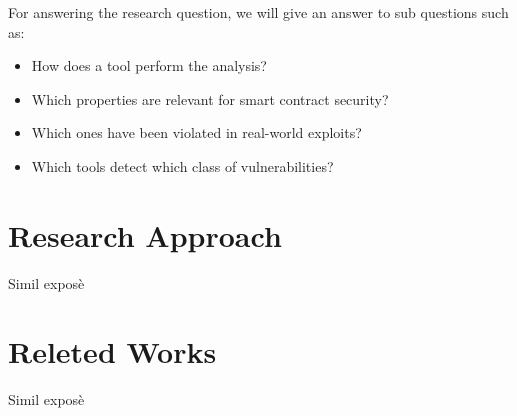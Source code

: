 For answering the research question, we will give an answer to sub questions such as: 
\begin{itemize}
  \item How does a tool perform the analysis? 
  \item Which properties are relevant for smart contract security?
  \item Which ones have been violated in real-world exploits? 
  \item Which tools detect which class of vulnerabilities? 
\end{itemize}

\section{Research Approach}
\label{sec:Introduction:ResearchApproach}
Simil exposè

\section{Releted Works}
\label{sec:Introduction:ReletedWorks}
Simil exposè